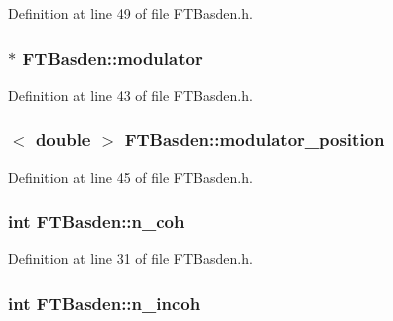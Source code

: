 Definition at line 49 of file FTBasden.h.

\hypertarget{classFTBasden_a1042a3192c3eeedb17421dea33637fc2}{
\subsubsection[{modulator}]{$\ast$ {\bf FTBasden::modulator}}}
\label{classFTBasden_a1042a3192c3eeedb17421dea33637fc2}


Definition at line 43 of file FTBasden.h.

\hypertarget{classFTBasden_a3c5201a3b733632396c088c037dfb452}{
\subsubsection[{modulator\_\-position}]{$<$ double $>$ {\bf FTBasden::modulator\_\-position}}}
\label{classFTBasden_a3c5201a3b733632396c088c037dfb452}


Definition at line 45 of file FTBasden.h.

\hypertarget{classFTBasden_a73eaee344474c1a9684092fc153c276a}{
\subsubsection[{n\_\-coh}]{\setlength{\rightskip}{0pt plus 5cm}int {\bf FTBasden::n\_\-coh}}}
\label{classFTBasden_a73eaee344474c1a9684092fc153c276a}


Definition at line 31 of file FTBasden.h.

\hypertarget{classFTBasden_a08a54e66d27db92948d214db32a271d4}{
\subsubsection[{n\_\-incoh}]{\setlength{\rightskip}{0pt plus 5cm}int {\bf FTBasden::n\_\-incoh}}}
\label{classFTBasden_a08a54e66d27db92948d214db32a271d4}


